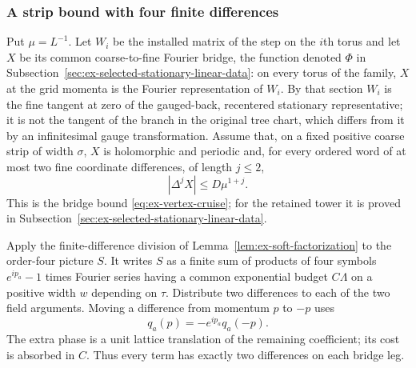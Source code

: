 \subsubsection{A strip bound with four finite differences}
Put $\mu=L^{-1}$. Let $W_i$ be the installed matrix of the step on
the $i$th torus and let $X$ be its common coarse-to-fine Fourier
bridge, the function denoted $\Phi$ in
Subsection~\ref{sec:ex-selected-stationary-linear-data}: on every torus of
the family, $X$ at the grid momenta is the Fourier representation of
$W_i$. By that section $W_i$ is the fine tangent at zero of the
gauged-back, recentered stationary representative; it is not the
tangent of the branch in the original tree chart, which differs from
it by an infinitesimal gauge transformation.
Assume that, on a fixed positive coarse strip of width $\sigma$,
$X$ is holomorphic and periodic and, for every ordered word of at
most two fine coordinate differences, of length $j\le2$,
\begin{equation}\label{eq:inherited-bridge-price}
                      |\Delta^j X|\le D\mu^{1+j}.
\end{equation}
This is the bridge bound \eqref{eq:ex-vertex-cruise}; for the retained
tower it is proved in
Subsection~\ref{sec:ex-selected-stationary-linear-data}.

Apply the finite-difference division of
Lemma~\ref{lem:ex-soft-factorization} to the order-four picture
$S$. It writes $S$ as a finite sum of products of four symbols
$e^{ip_a}-1$ times Fourier series having a common exponential
budget $C\Lambda$ on a positive width $w$ depending on $\tau$.
Distribute two differences to each of the two field arguments.
Moving a difference from momentum $p$ to $-p$ uses
\[
                      q_a(p)=-e^{ip_a}q_a(-p).
\]
The extra phase is a unit lattice translation of the remaining
coefficient; its cost is absorbed in $C$. Thus every term has
exactly two differences on each bridge leg.


